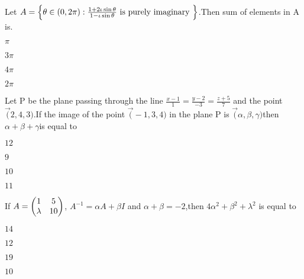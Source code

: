 \iffalse
  \title{Assignment}
  \author{Gunda Srihaas}
  \section{mcq-single}
\fi

    \item 
        Let $A= \left\{\theta \in \left(0,2\pi\right):\frac{1+2\iota\sin{\theta}}{1-\iota\sin{\theta}} \text{ is purely imaginary }\right\}$.Then sum of elements in A is. 
        \hfill{}
               \begin{enumerate}
               \begin{multicols}{4}
                \item $\pi$
                \item $3\pi$                 
                \item $4\pi$               
                \item $2\pi$
                \end{multicols}
            \end{enumerate}
            
	\item Let P be the plane passing through the line $\frac{x-1}{1}= \frac{y-2}{-3}= \frac{z+5}{7}$ and the point $\vec (2,4,3)$.If the image of the point $\vec(-1,3,4)$ in the plane P is $\vec(\alpha,\beta,\gamma)$then $\alpha+\beta+\gamma$is equal to
        \hfill{}
                \begin{enumerate}
                \begin{multicols}{4}
                \item $12$
                \item $9$
                \item $10$ 
                \item $11$
                \end{multicols}
            \end{enumerate} 
            
	\item If $A=\begin{pmatrix}1 & 5 \\ \lambda & 10\end{pmatrix}$, $A^{-1}=\alpha A+\beta I$ and $\alpha+\beta=-2$,then $4\alpha^2+\beta^2+\lambda^2$ is equal to
        \hfill{}
        \begin{enumerate}    
        \begin{multicols}{4}
                \item $14$
                \item $12$
                \item $19$
                \item $10$
                \end{multicols}
       \end{enumerate}
       
